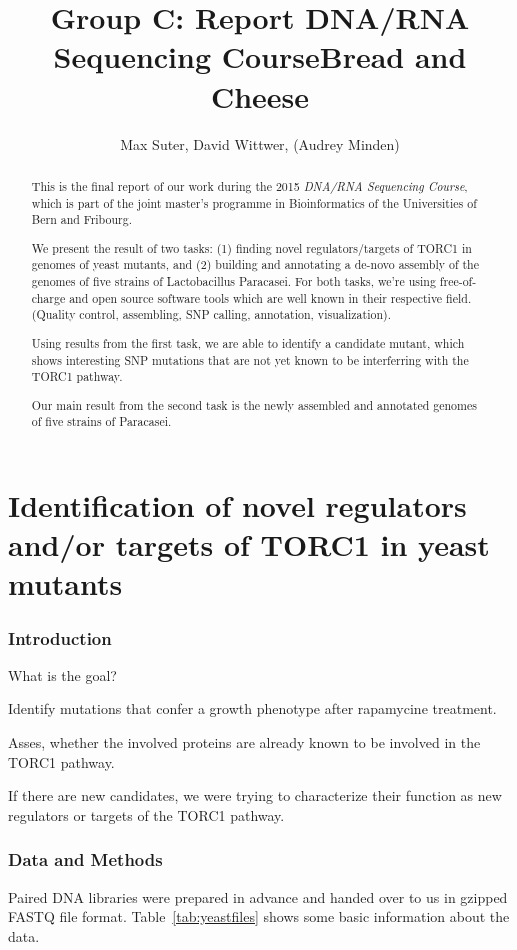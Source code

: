 \documentclass[10pt,a4paper]{article}
\title{Group C: Report DNA/RNA Sequencing Course\newline Bread and Cheese}
\author{Max Suter, David Wittwer, (Audrey Minden)}
\begin{document}
\maketitle

\begin{abstract}
This is the final report of our work during the 2015 \emph{DNA/RNA Sequencing Course}, which is part of the joint master's programme in Bioinformatics of the Universities of Bern and Fribourg.

We present the result of two tasks: (1) finding novel regulators/targets of TORC1 in genomes of yeast mutants, and  (2) building and annotating a de-novo assembly of the genomes of five strains of Lactobacillus Paracasei. For both tasks, we're using free-of-charge and open source software tools which are well known in their respective field. (Quality control, assembling, SNP calling, annotation, visualization).

Using results from the first task, we are able to identify a candidate mutant, which shows interesting SNP mutations that are not yet known to be interferring with the TORC1 pathway.


Our main result from the second task is the newly assembled and annotated genomes of five strains of Paracasei.


\end{abstract}


\pagebreak
\part{Identification of novel regulators and/or targets of TORC1 in yeast mutants}

\section{Introduction}
What is the goal?

Identify mutations that confer a growth phenotype after rapamycine treatment.

Asses, whether the involved proteins are already known to be involved in the TORC1 pathway.

If there are new candidates, we were trying to characterize their function as new regulators or targets of the TORC1 pathway.

\section{Data and Methods}
Paired DNA libraries were prepared in advance and handed over to us in gzipped FASTQ file format. Table~\ref{tab:yeastfiles} shows some basic information about the data.
\end{document}
